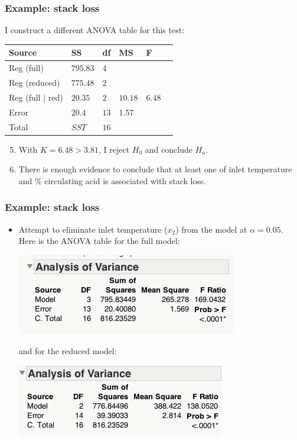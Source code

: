 \documentclass[handout]{beamer}\usepackage[]{graphicx}\usepackage[]{color}
\numberwithin{equation}{section}
\begin{document}
\begin{frame}
\frametitle{Example: stack loss} \small
I construct a different ANOVA table for this test:
\begin{center}
\begin{tabular}{llllll}
Source & SS & df & MS & F & \\ \hline
Reg (full) & $ 795.83  $ & $4$ &  & &  \\ 
Reg (reduced) & $775.48$ & $2$&  & &  \\ 
Reg (full $\mid$ red) & $20.35$ & $2$ & $10.18$ & $6.48$ &  \\ 
Error & $20.4$ & $13$ & $1.57$& & \\ \hline
Total & $SST$ & $16$ & & & 
\end{tabular}
\end{center}
\begin{enumerate}
\setcounter{enumi}{4}
\pause \item With $K = 6.48 > 3.81$, I reject $H_0$ and conclude $H_a$.
\pause \item There is enough evidence to conclude that at least one of inlet temperature and \% circulating acid is associated with stack loss.
\end{enumerate}
\end{frame}

\begin{frame}
\frametitle{Example: stack loss}
\begin{itemize}
\item Attempt to eliminate inlet temperature ($x_2$) from the model at $\alpha = 0.05$. Here is the ANOVA table for the full model:
\begin{center}
 \includegraphics{../../fig/slfullanova1.png}
\end{center}
and for the reduced model:
\begin{center}
 \includegraphics{../../fig/slredanova2.png}
\end{center}
\end{itemize}
\end{frame}
\end{document}
